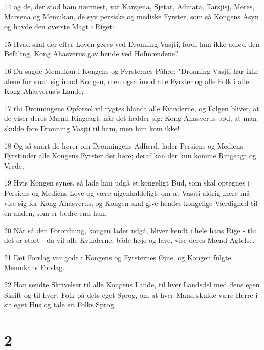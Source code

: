 \par 14 og de, der stod ham nærmest, var Karsjena, Sjetar, Admata, Tarsjisj, Meres, Marsena og Memukan, de syv persiske og mediske Fyrster, som så Kongens Åsyn og havde den øverste Magt i Riget:
\par 15 Hvad skal der efter Loven gøres ved Dronning Vasjti, fordi hun ikke adlød den Befaling, Kong Ahasverus gav hende ved Hofmændene?
\par 16 Da sagde Memukan i Kongens og Fyrsternes Påhør: "Dronning Vasjti har ikke alene forbrudt sig imod Kongen, men også imod alle Fyrster og alle Folk i alle Kong Ahasverus's Lande;
\par 17 thi Dronningens Opførsel vil rygtes blandt alle Kvinderne, og Følgen bliver, at de viser deres Mænd Ringeagt, når det hedder sig: Kong Ahasverus bød, at man skulde føre Dronning Vasjti til ham, men hun kom ikke!
\par 18 Og så snart de hører om Dronningens Adfærd, lader Persiens og Mediens Fyrstinder alle Kongens Fyrster det høre; deraf kan der kun komme Ringeagt og Vrede.
\par 19 Hvis Kongen synes, så lade han udgå et kongeligt Bud, som skal optegnes i Persiens og Mediens Love og være uigenkaldeligt, om at Vasjti aldrig mere må vise sig for Kong Ahasverus; og Kongen skal give hendes kongelige Værdighed til en anden, som er bedre end hun.
\par 20 Når så den Forordning, kongen lader udgå, bliver kendt i hele hans Rige - thi det er stort - da vil alle Kvinderne, både høje og lave, vise deres Mænd Agtelse.
\par 21 Det Forslag var godt i Kongens og Fyrsternes Øjne, og Kongen fulgte Memukans Forslag.
\par 22 Han sendte Skrivelser til alle Kongens Lande, til hver Landsdel med dens egen Skrift og til hvert Folk på dets eget Sprog, om at hver Mand skulde være Herre i sit eget Hus og tale sit Folks Sprog.

\chapter{2}

